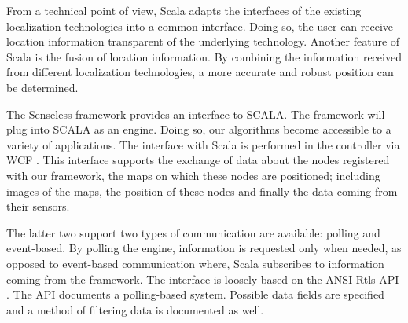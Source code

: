 From a technical point of view, Scala adapts the interfaces of the existing localization technologies into a common interface. Doing so, the user can receive location information transparent of the underlying technology. 
Another feature of Scala is the fusion of location information. By combining the information received from different localization technologies, a more accurate and robust position can be determined.

The Senseless framework provides an interface to SCALA. The framework will plug into SCALA as an engine. Doing so, our algorithms become accessible to a variety of applications.
The interface with Scala is performed in the controller via WCF \cite{WCF}. This interface supports the exchange of data about the nodes registered with our framework, the maps on which these nodes are positioned; including images of the maps, the position of these nodes and finally the data coming from their sensors.

The latter two support two types of communication are available: polling and event-based. By polling the engine, information is requested only when needed, as opposed to event-based communication where, Scala subscribes to information coming from the framework. The interface is loosely based on the ANSI Rtls API \cite{RTLS}.
The API documents a polling-based system. Possible data fields are specified and a method of filtering data is documented as well.
